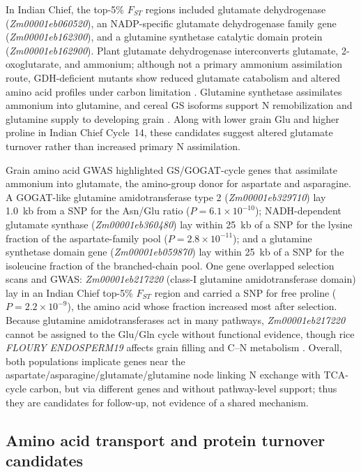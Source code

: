 In Indian Chief, the top-5\% $F_{ST}$ regions included glutamate dehydrogenase (\textit{Zm00001eb060520}), an NADP-specific glutamate dehydrogenase family gene (\textit{Zm00001eb162300}), and a glutamine synthetase catalytic domain protein (\textit{Zm00001eb162900}). Plant glutamate dehydrogenase interconverts glutamate, 2-oxoglutarate, and ammonium; although not a primary ammonium assimilation route, GDH-deficient mutants show reduced glutamate catabolism and altered amino acid profiles under carbon limitation \citep{Miyashita2008GDH,Dellero2020AminoNUE}. Glutamine synthetase assimilates ammonium into glutamine, and cereal GS isoforms support N remobilization and glutamine supply to developing grain \citep{Wei2021WheatGS,Fujita2022RiceGS13}. Along with lower grain Glu and higher proline in Indian Chief Cycle~14, these candidates suggest altered glutamate turnover rather than increased primary N assimilation.

Grain amino acid GWAS highlighted GS/GOGAT-cycle genes that assimilate ammonium into glutamate, the amino-group donor for aspartate and asparagine. A GOGAT-like glutamine amidotransferase type 2 (\textit{Zm00001eb329710}) lay 1.0~kb from a SNP for the Asn/Glu ratio ($P = 6.1 \times 10^{-10}$); NADH-dependent glutamate synthase (\textit{Zm00001eb360480}) lay within 25~kb of a SNP for the lysine fraction of the aspartate-family pool ($P = 2.8 \times 10^{-11}$); and a glutamine synthetase domain gene (\textit{Zm00001eb059870}) lay within 25~kb of a SNP for the isoleucine fraction of the branched-chain pool. One gene overlapped selection scans and GWAS: \textit{Zm00001eb217220} (class-I glutamine amidotransferase domain) lay in an Indian Chief top-5\% $F_{ST}$ region and carried a SNP for free proline ($P = 2.2 \times 10^{-9}$), the amino acid whose fraction increased most after selection. Because glutamine amidotransferases act in many pathways, \textit{Zm00001eb217220} cannot be assigned to the Glu/Gln cycle without functional evidence, though rice \textit{FLOURY ENDOSPERM19} affects grain filling and C--N metabolism \citep{Lou2021FLO19}. Overall, both populations implicate genes near the aspartate/asparagine/glutamate/glutamine node linking N exchange with TCA-cycle carbon, but via different genes and without pathway-level support; thus they are candidates for follow-up, not evidence of a shared mechanism.

\subsection{Amino acid transport and protein turnover candidates}


